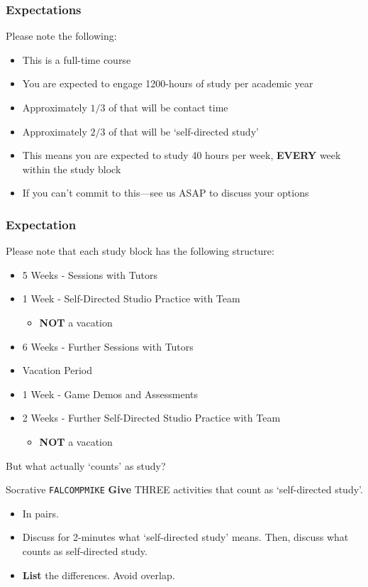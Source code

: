 \begin{frame}
	\frametitle{Expectations}
	
	Please note the following:
	
	\begin{itemize}
		\item This is a full-time course
		\item You are expected to engage 1200-hours of study per academic year
		\item Approximately $1/3$ of that will be contact time
		\item Approximately $2/3$ of that will be `self-directed study'
		\item This means you are expected to study 40 hours per week, \textbf{EVERY} week within the study block
		\item If you can't commit to this---see us ASAP to discuss your options
	\end{itemize}

\end{frame}

\begin{frame}
	\frametitle{Expectation}
	
	Please note that each study block has the following structure:
	
	\begin{itemize}
		\item 5 Weeks - Sessions with Tutors
		\item 1 Week - Self-Directed Studio Practice with Team
		\begin{itemize}
			\item \textbf{NOT} a vacation
		\end{itemize}
		\item 6 Weeks - Further Sessions with Tutors
		\item Vacation Period
		\item 1 Week - Game Demos and Assessments
		\item 2 Weeks - Further Self-Directed Studio Practice with Team
		\begin{itemize}
			\item \textbf{NOT} a vacation
		\end{itemize}
	\end{itemize}
	
	But what actually `counts' as study?

\end{frame}

\begin{frame}{Socrative \texttt{FALCOMPMIKE}}
	\textbf{Give} THREE activities that count as `self-directed study'.
	
	\begin{itemize}
		\item In pairs.
		\item Discuss for 2-minutes what `self-directed study' means. Then, discuss what counts as self-directed study.
		\item \textbf{List} the differences. Avoid overlap.
	\end{itemize}
\end{frame}


